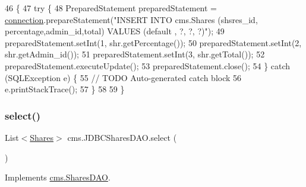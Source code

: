 \begin{DoxyCode}
46                                    \{
47         \textcolor{keywordflow}{try} \{
48             PreparedStatement preparedStatement = \mbox{\hyperlink{classcms_1_1_j_d_b_c_shares_d_a_o_a55148864b3f3a771f61d1ac5a2bf841f}{connection}}.prepareStatement(\textcolor{stringliteral}{"INSERT INTO
       cms.Shares (shsres\_id, percentage,admin\_id,total) VALUES (default , ?, ?, ?)"});
49             preparedStatement.setInt(1,  shr.getPercentage());
50             preparedStatement.setInt(2,  shr.getAdmin\_id());
51             preparedStatement.setInt(3,  shr.getTotal());
52             preparedStatement.executeUpdate();
53             preparedStatement.close();
54         \} \textcolor{keywordflow}{catch} (SQLException e) \{
55             \textcolor{comment}{// TODO Auto-generated catch block}
56             e.printStackTrace();
57         \}
58          
59     \}
\end{DoxyCode}
\mbox{\label{classcms_1_1_j_d_b_c_shares_d_a_o_a0413a9f3a13a2939aa617d0c55a33e46}} 
\subsubsection{\texorpdfstring{select()}{select()}}
{\footnotesize\ttfamily List$<$\mbox{\hyperlink{classcms_1_1_shares}{Shares}}$>$ cms.\+J\+D\+B\+C\+Shares\+D\+A\+O.\+select (\begin{DoxyParamCaption}{ }\end{DoxyParamCaption})\hspace{0.3cm}{\ttfamily [inline]}}



Implements \mbox{\hyperlink{interfacecms_1_1_shares_d_a_o_ae7aa2a885c92a0d965d434e090d248ee}{cms.\+Shares\+D\+AO}}.


